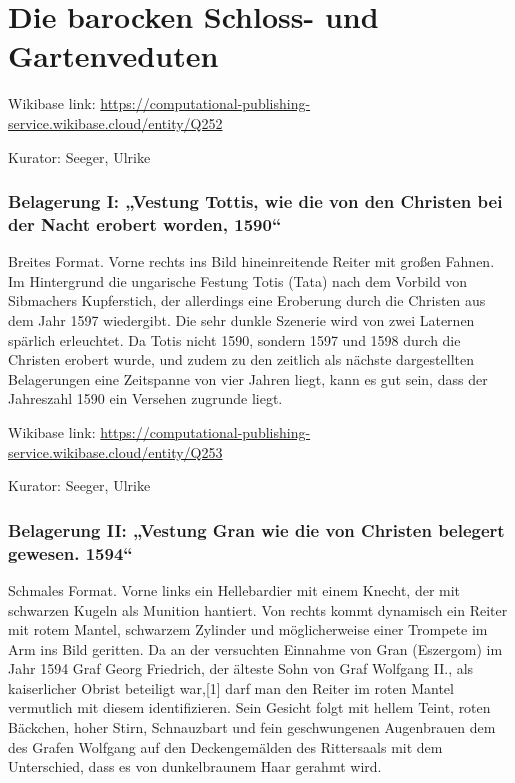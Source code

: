 \documentclass[
  11pt,
  a4paper,
  openany]{book}
\begin{document}

\chapter{Die barocken Schloss- und
Gartenveduten}\label{die-barocken-schloss--und-gartenveduten}

Wikibase link:
\url{https://computational-publishing-service.wikibase.cloud/entity/Q252}

Kurator: Seeger, Ulrike

\subsection{Belagerung I: „Vestung Tottis, wie die von den Christen bei
der Nacht erobert worden,
1590``}\label{belagerung-i-vestung-tottis-wie-die-von-den-christen-bei-der-nacht-erobert-worden-1590}

Breites Format. Vorne rechts ins Bild hineinreitende Reiter mit großen
Fahnen. Im Hintergrund die ungarische Festung Totis (Tata) nach dem
Vorbild von Sibmachers Kupferstich, der allerdings eine Eroberung durch
die Christen aus dem Jahr 1597 wiedergibt. Die sehr dunkle Szenerie wird
von zwei Laternen spärlich erleuchtet. Da Totis nicht 1590, sondern 1597
und 1598 durch die Christen erobert wurde, und zudem zu den zeitlich als
nächste dargestellten Belagerungen eine Zeitspanne von vier Jahren
liegt, kann es gut sein, dass der Jahreszahl 1590 ein Versehen zugrunde
liegt.

Wikibase link:
\url{https://computational-publishing-service.wikibase.cloud/entity/Q253}

Kurator: Seeger, Ulrike

\subsection{Belagerung II: „Vestung Gran wie die von Christen belegert
gewesen.
1594``}\label{belagerung-ii-vestung-gran-wie-die-von-christen-belegert-gewesen.-1594}

Schmales Format. Vorne links ein Hellebardier mit einem Knecht, der mit
schwarzen Kugeln als Munition hantiert. Von rechts kommt dynamisch ein
Reiter mit rotem Mantel, schwarzem Zylinder und möglicherweise einer
Trompete im Arm ins Bild geritten. Da an der versuchten Einnahme von
Gran (Eszergom) im Jahr 1594 Graf Georg Friedrich, der älteste Sohn von
Graf Wolfgang II., als kaiserlicher Obrist beteiligt war,{[}1{]} darf
man den Reiter im roten Mantel vermutlich mit diesem identifizieren.
Sein Gesicht folgt mit hellem Teint, roten Bäckchen, hoher Stirn,
Schnauzbart und fein geschwungenen Augenbrauen dem des Grafen Wolfgang
auf den Deckengemälden des Rittersaals mit dem Unterschied, dass es von
dunkelbraunem Haar gerahmt wird.
\end{document}

